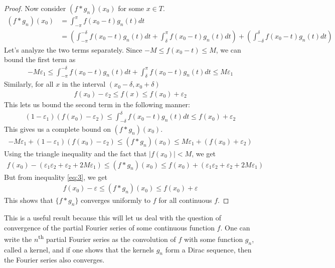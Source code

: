 \documentclass[12pt, titlepage]{article}
\theoremstyle{definition}
\newcommand{\vep}{\varepsilon}
\begin{document}
\begin{proof}
    Now consider $(f \ast g_n)(x_0)$ for some $x \in T$.
    \begin{align*}
        (f \ast g_n)(x_0) &= \int_{-\pi}^{\pi} f(x_0-t) g_n(t) dt \\
        &= \left( \int_{-\pi}^{-\delta} f(x_0-t) g_n(t) dt + \int_{\delta}^{\pi} f(x_0-t) g_n(t) dt \right) + \left( \int_{-\delta}^{\delta} f(x_0-t) g_n(t) dt \right)
    \end{align*}
    Let's analyze the two terms separately. Since $-M \leq f(x_0-t) \leq M$, we can bound the first term as
    \begin{align*}
        -M\vep_1 \leq \int_{-\pi}^{-\delta} f(x_0-t) g_n(t) dt + \int_{\delta}^{\pi} f(x_0-t) g_n(t) dt \leq M\vep_1
    \end{align*}
    Similarly, for all $x$ in the interval $(x_0 -\delta, x_0 + \delta)$
    \begin{align*}
        f(x_0) - \vep_2 \leq f(x) \leq f(x_0) + \vep_2
    \end{align*}
    This lets us bound the second term in the following manner:
    \begin{align*}
        (1- \vep_1)(f(x_0) - \vep_2) \leq \int_{-\delta}^{\delta} f(x_0 - t)g_n(t) dt \leq f(x_0) + \vep_2
    \end{align*}
    This gives us a complete bound on $(f \ast g_n)(x_0)$.
    \begin{align*}
        -M\vep_1 + (1 - \vep_1)(f(x_0) - \vep_2) \leq (f \ast g_n)(x_0) \leq M\vep_1 + (f(x_0) + \vep_2)
    \end{align*}
    Using the triangle inequality and the fact that $|f(x_0)| < M$, we get
    \begin{align*}
        f(x_0) - (\vep_1 \vep_2 + \vep_2 + 2M\vep_1) \leq (f \ast g_n)(x_0) \leq f(x_0) + (\vep_1 \vep_2 + \vep_2 + 2M\vep_1)
    \end{align*}
    But from inequality \ref{eq:3}, we get
    \begin{align*}
        f(x_0) - \vep \leq (f \ast g_n)(x_0) \leq f(x_0) + \vep
    \end{align*}
    This shows that $\{f \ast g_n\}$ converges uniformly to $f$ for all continuous $f$.
\end{proof}

This is a useful result because this will let us deal with the question of convergence of the partial Fourier series of some continuous function $f$. One can write the $n$\textsuperscript{th} partial Fourier series as the convolution of $f$ with some function $g_n$, called a kernel, and if one shows that the kernels $g_n$ form a Dirac sequence, then the Fourier series also converges.
\end{document}
